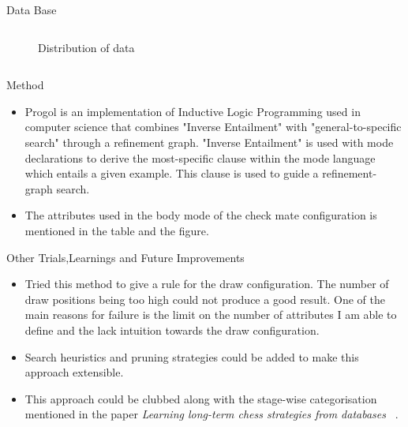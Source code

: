 \documentclass[final,hyperref={pdfpagelabels=false}]{beamer}
\begin{document}
\begin{frame}[t]
\begin{columns}[t]
\begin{column}{.465\textwidth}
\begin{block}{Data Base}
\begin{columns}
\begin{column}{.43\textwidth}
\begin{figure}
\caption{Distribution of data}
\end{figure}
\end{column}
\end{columns} %

\end{block}


\begin{block}{Method}
\begin{itemize}
\item Progol is an implementation of Inductive Logic Programming used in computer science that combines "Inverse Entailment" with "general-to-specific search" through a refinement graph. "Inverse Entailment" is used with mode declarations to derive the most-specific clause within the mode language which entails a given example. This clause is used to guide a refinement-graph search. ~\cite{wiki}
\item The attributes used in the body mode of the check mate configuration is mentioned in the table and the figure.
\end{itemize}
\end{block}


\begin{block}{Other Trials,Learnings and Future Improvements}
\begin{itemize}
\item Tried this method to give a rule for the draw configuration. The number of draw positions being too high could not produce a good result. One of the main reasons for failure is the limit on the number of attributes I am able to define and the lack intuition towards the draw configuration.
\item Search heuristics and pruning strategies could be added to make this approach extensible. 
\item This approach could be clubbed along with the stage-wise categorisation mentioned in the paper \emph{Learning long-term chess strategies from databases} ~\cite{paper}.
\end{itemize}
\end{block}


\end{column}
\end{columns}
\end{frame}
\end{document}
